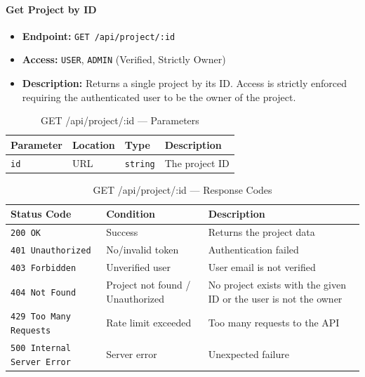 \paragraph{Get Project by ID}
\label{subsubsec:get-project-by-id}

\begin{itemize}
  \item \textbf{Endpoint:} \texttt{GET /api/project/:id}
  \item \textbf{Access:} \texttt{USER}, \texttt{ADMIN} (Verified, Strictly Owner)
  \item \textbf{Description:} Returns a single project by its ID.
  Access is strictly enforced requiring the authenticated user to be the owner of the project.
\end{itemize}

\begin{table}[H]
\centering
\renewcommand{\arraystretch}{1.3}
\begin{tabularx}{\textwidth}{|l|l|l|X|}
\hline
\textbf{Parameter} & \textbf{Location} & \textbf{Type} & \textbf{Description} \\
\hline
\texttt{id} & URL & \texttt{string} & The project ID \\
\hline
\end{tabularx}
\caption{GET /api/project/:id — Parameters}
\label{tab:get-project-by-id-params}
\end{table}

\begin{table}[H]
\centering
\renewcommand{\arraystretch}{1.3}
\begin{tabularx}{\textwidth}{|l|l|X|}
\hline
\textbf{Status Code} & \textbf{Condition} & \textbf{Description} \\
\hline
\texttt{200 OK}           & Success              & Returns the project data \\
\hline
\texttt{401 Unauthorized} & No/invalid token     & Authentication failed \\
\hline
\texttt{403 Forbidden}    & Unverified user & User email is not verified \\
\hline
\texttt{404 Not Found}    & Project not found / Unauthorized & No project exists with the given ID or the user is not the owner \\
\hline
\texttt{429 Too Many Requests} & Rate limit exceeded & Too many requests to the API \\
\hline
\texttt{500 Internal Server Error} & Server error & Unexpected failure \\
\hline
\end{tabularx}
\caption{GET /api/project/:id — Response Codes}
\label{tab:get-project-by-id-responses}
\end{table}
\FloatBarrier

